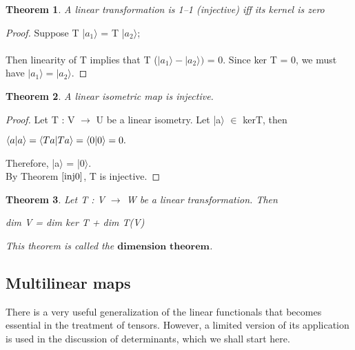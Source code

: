 \documentclass[12pt,a4paper]{article}
\newtheorem{thm}{Theorem}
\begin{document}
\begin{thm} \label{inj0}
A linear transformation is 1–1 (injective) iff its kernel is
zero
\end{thm}
\begin{proof}
Suppose T |$a_1\rangle$ = T |$a_2\rangle$; \\\\Then linearity of T implies that T ($|a_1\rangle - |a_2\rangle)$ = 0. Since ker T = 0, we must have $|a_1\rangle = |a_2 \rangle$.
\end{proof}
\begin{thm} \label{inj}
A linear isometric map is injective.
\end{thm}
\begin{proof}
Let T : V $\to$ U be a linear isometry. Let |a$\rangle$ $\in$ kerT, then
\begin{center}
$\braket{a | a} = \braket{Ta | Ta} = \braket{0|0} = 0.$ 
\end{center}
Therefore, |a$\rangle$ = |0$\rangle$.\\
By Theorem $\ref{inj0}$, T is injective.
\end{proof}
\begin{thm} \label{dimthm}
Let T : V $\to$ W be a linear transformation. Then
\begin{center}
dim V = dim ker T + dim T(V)
\end{center}
This theorem is called the $\textbf{dimension theorem}$.
\end{thm}
\subsection{Multilinear maps}
There is a very useful generalization of the linear functionals that becomes essential in the treatment of tensors. However, a limited version of its application is used in the discussion of determinants, which we shall start here.
\end{document}
